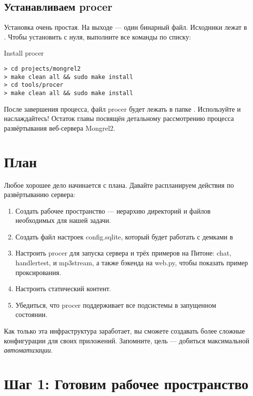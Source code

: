 \subsection{Устанавливаем procer}

Установка очень простая. На выходе --- один бинарный файл. Исходники лежат в
. Чтобы установить с нуля, выполните все команды по
списку:

\begin{code}{Install procer}
\begin{lstlisting}
> cd projects/mongrel2
> make clean all && sudo make install
> cd tools/procer
> make clean all && sudo make install
\end{lstlisting}
\end{code}

После завершения процесса, файл procer будет лежать в папке
. Используйте и наслаждайтесь! Остаток главы посвящён
детальному рассмотрению процесса развёртывания веб-сервера Mongrel2.

\section{План}

Любое хорошее дело начинается с плана. Давайте распланируем действия по
развёртыванию сервера:

\begin{enumerate}
\item Создать рабочее пространство --- иерархию директорий и файлов необходимых
    для нашей задачи.
\item Создать файл настроек config.sqlite, который будет работать с демками в
\item Настроить procer для запуска сервера и трёх примеров на Питоне: chat,
    handlertest, и mp3stream, а также бэкенда на web.py, чтобы показать пример
    проксирования.
\item Настроить статический контент.
\item Убедиться, что procer поддерживает все подсистемы в запущенном состоянии.
\end{enumerate}

Как только эта инфраструктура заработает, вы сможете создавать более сложные
конфигурации для своих приложений. Запомните, цель --- добиться максимальной
\emph{автоматизации}.

\section{Шаг 1: Готовим рабочее пространство}


